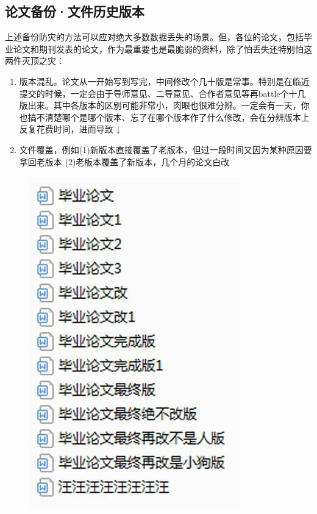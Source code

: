 \subsection{论文备份·文件历史版本}
\begin{newminipage}[0.65]
    上述备份防灾的方法可以应对绝大多数数据丢失的场景。但，各位的论文，包括毕业论文和期刊发表的论文，作为最重要也是最脆弱的资料，除了怕丢失还特别怕这两件灭顶之灾：
    \begin{enumerate}
        \item 版本混乱。论文从一开始写到写完，中间修改个几十版是常事。特别是在临近提交的时候，一定会由于导师意见、二导意见、合作者意见等再battle个十几版出来。其中各版本的区别可能非常小，肉眼也很难分辨。一定会有一天，你也搞不清楚哪个是哪个版本、忘了在哪个版本作了什么修改，会在分辨版本上反复花费时间，进而导致 ↓
        \item 文件覆盖，例如(1)新版本直接覆盖了老版本，但过一段时间又因为某种原因要拿回老版本 (2)老版本覆盖了新版本，几个月的论文白改
    \end{enumerate}
\end{newminipage}
\begin{newminipage}[0.34]
    \begin{figure}[H]
        \includegraphics[width=0.95\columnwidth, right]{author-folder/Kai.Wu/thesis_versions.jpg}
    \end{figure}
\end{newminipage}

